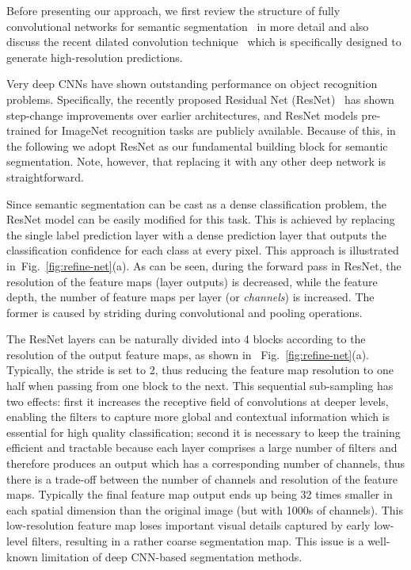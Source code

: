 \documentclass[10pt,twocolumn,letterpaper]{article}
\newcommand{\Fig}{Fig.\xspace}
\begin{document}
Before presenting our approach, we first review the structure of fully convolutional networks for semantic segmentation~\cite{LongSD14} in more detail and also discuss the recent dilated convolution technique~\cite{ChenPK0Y16} which is specifically designed to generate high-resolution predictions.

Very deep CNNs
have shown outstanding performance on object recognition problems.
Specifically, the recently proposed Residual Net (ResNet)~\cite{He:2016:ResNet} has shown step-change improvements over earlier architectures, and ResNet models pre-trained for ImageNet recognition tasks are publicly available.
Because of this, in the following we adopt ResNet as our fundamental building block for semantic segmentation. Note, however, that replacing it with any other deep network is straightforward.

Since semantic segmentation can be cast as a dense classification problem, the ResNet model can be easily modified for this task.
This is achieved by replacing the single label prediction layer with a dense prediction layer that outputs the classification confidence for each class at every pixel.
This approach is illustrated in~\Fig~\ref{fig:refine-net}(a).
As can be seen, during the forward pass in ResNet, the resolution of the feature maps (layer outputs) is decreased, while the feature depth, \ie the number of feature maps per layer (or {\em channels}) is increased.
The former is caused by striding during convolutional and pooling operations.

The ResNet layers can be naturally divided into 4 blocks according to the resolution of the output feature maps, as shown in ~\Fig~\ref{fig:refine-net}(a).
Typically, the stride is set to 2, thus reducing the feature map resolution to one half when passing from one block to the next. This sequential sub-sampling has two effects: first it increases the receptive field of convolutions at deeper levels, enabling the filters to capture more global and contextual information which is essential for high quality classification; second it is necessary to keep the training efficient and tractable because each layer comprises a large number of filters and therefore produces an output which has a corresponding number of channels, thus there is a trade-off between the number of channels and resolution of the feature maps. Typically the final feature map output ends up being 32 times smaller in each spatial dimension than the original image (but with 1000s of channels). 
This low-resolution feature map loses important visual details captured by early low-level filters, resulting in a rather coarse segmentation map.
This issue is a well-known limitation of deep CNN-based segmentation methods. 
\end{document}
